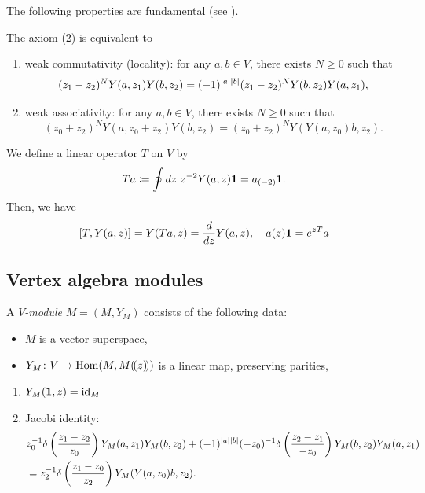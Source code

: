 \documentclass[final,reqno]{amsart}
\begin{document}
The following properties are fundamental (see \cite[\S~3.3, 3.4]{LL04}).

\begin{prp}\label{prp: axiomva}
    The axiom (2) is equivalent to
    \begin{enumerate}[label=(2-\arabic*)]
        \item 
        weak commutativity (locality): for any $a,b\in V$, there exists $N\geq 0$ such that
        \[
            (z_1-z_2)^NY(a,z_1)Y(b,z_2)=(-1)^{\left| a \right|\left| b \right|}(z_1-z_2)^NY(b,z_2)Y(a,z_1),
        \]
        \item
        weak associativity: for any $a,b\in V$, there exists $N\geq 0$ such that
        \[
            (z_0+z_2)^NY(a,z_0+z_2)Y(b,z_2)=(z_0+z_2)^NY(Y(a,z_0)b,z_2).
        \]
    \end{enumerate}
\end{prp}

\begin{prp}\label{prp: trans equiv va}
    We define a linear operator $T$ on $V$ by
    \[
        Ta\ceq\oint dz\ z^{-2}Y(a,z)\one=a_{(-2)}\one.
    \]
    Then, we have
    \[
        [T,Y(a,z)]=Y(Ta,z)=\frac{d}{dz}Y(a,z),
        \quad
        a(z)\mathbf{1}=e^{zT}a
    \]
\end{prp}

\subsection{Vertex algebra modules}
\begin{dfn}
    A \emph{$V$-module} $M=(M,Y_M)$ consists of the following data:
    \begin{itemize}
        \item
        $M$ is a vector superspace,
        \item
        $Y_M\colon V\to \operatorname{Hom}(M,M(\!( z )\!))$ is a linear map, preserving parities,
    \end{itemize}
    \begin{enumerate}
        \item
        $Y_M(\mathbf{1},z)=\operatorname{id}_M$
        \item
        Jacobi identity:
        \[
        \begin{split}
            &z_0^{-1}\delta\left(\frac{z_1-z_2}{z_0}\right)Y_M(a,z_1)Y_M(b,z_2)+(-1)^{\left| a \right|\left| b \right|}(-z_0)^{-1}\delta\left(\frac{z_2-z_1}{-z_0}\right)Y_M(b,z_2)Y_M(a,z_1)\\
            &=z_2^{-1}\delta\left(\frac{z_1-z_0}{z_2}\right)Y_M(Y(a,z_0)b,z_2).
        \end{split}
        \]
    \end{enumerate}
\end{dfn}
\end{document}

